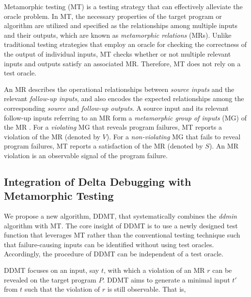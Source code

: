 Metamorphic testing (MT)  \cite{Chen98, Segura16, Chen2018} is a testing strategy that can effectively alleviate the oracle problem.
In MT, the necessary properties of the target program or algorithm are utilized and specified as the relationships among multiple inputs and their outputs, which are known as \emph{metamorphic relations} (MRs).
Unlike traditional testing strategies that employ an oracle for checking the correctness of the output of individual inputs, MT checks whether or not multiple relevant inputs and outputs satisfy an associated MR.
Therefore, MT does not rely on a test oracle.

An MR describes the operational relationships between \emph{source inputs} and the relevant \emph{follow-up inputs}, and also encodes the expected relationships among the corresponding \emph{source} and \emph{follow-up outputs}.
A source input and its relevant follow-up inputs referring to an MR form a \emph{metamorphic group of inputs} (MG) of the MR \cite{Chen2018}.
For a \emph{violating} MG that reveals program failures, MT reports a violation of the MR (denoted by $V$).
For a \emph{non-violating} MG that fails to reveal program failures, MT reports a satisfaction of the MR (denoted by $S$).
An MR violation is an observable signal of the program failure. 




\subsection{Integration of Delta Debugging with Metamorphic Testing}
\label{sec:integration}

We propose a new algorithm, DDMT, that systematically combines the \emph{ddmin} algorithm with MT.
The core insight of DDMT is to use a newly designed test function that leverages MT rather than the conventional testing technique such that failure-causing inputs can be identified without using test oracles.
Accordingly, the procedure of DDMT can be independent of a test oracle.

DDMT focuses on an input, say $t$, with which a violation of an MR $r$ can be revealed on the target program $P$.
DDMT aims to generate a minimal input $t'$ from $t$ such that the violation of $r$ is still observable. 
That is,


